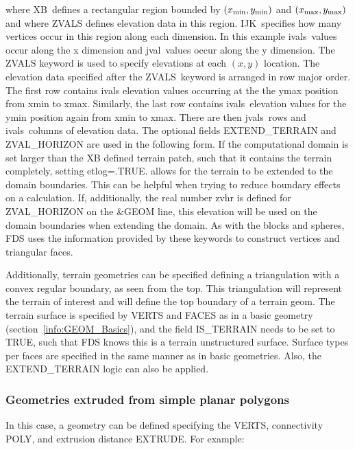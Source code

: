 \documentclass[12pt]{article}
\begin{document}
\noindent where {\ct XB}\ defines a rectangular region bounded by $(x_{\rm min}, y_{\rm min})$  and $(x_{\rm max}, y_{\rm max})$
and where {\ct ZVALS} defines elevation data in this region.
{\ct IJK}\ specifies how many vertices occur in this region along each dimension.
In this example {\ct ivals}\ values occur along the x dimension and {\ct jval}\ values occur along the y dimension.
The {\ct ZVALS} keyword is used to specify elevations at each $(x,y)$ location.
The elevation data specified after the {\ct ZVALS}\ keyword is arranged in row major order.
The first row contains {\ct ivals} elevation values occurring at the the ymax position from xmin to xmax.
Similarly, the last row contains
{\ct ivals}\ elevation values for the ymin position again from xmin to xmax.
There are then {\ct jvals}\ rows and {\ct ivals}\ columns of elevation data.
The optional fields {\ct EXTEND\_TERRAIN} and {\ct ZVAL\_HORIZON} are used in the following form. If the computational domain is set larger than the {\ct XB} defined terrain patch, such that it contains the terrain completely, setting {\ct etlog=.TRUE.} allows for the terrain to be extended to the domain boundaries. This can be helpful when trying to reduce boundary effects on a calculation.
If, additionally, the real number {\ct zvhr} is defined for {\ct ZVAL\_HORIZON} on the {\ct \&GEOM} line, this elevation will be used on the domain boundaries when extending the domain.
As with the blocks and spheres, FDS uses the information provided by these keywords to construct
vertices and triangular faces.

Additionally, terrain geometries can be specified defining a triangulation with a convex regular boundary, as seen from the top. This triangulation will represent the terrain of interest and will define the top boundary of a terrain geom. The terrain surface is specified by {\ct VERTS} and {\ct FACES} as in a basic geometry (section~\ref{info:GEOM_Basics}), and the field {\ct IS\_TERRAIN} needs to be set to {\ct TRUE}, such that FDS knows this is a terrain unstructured surface. Surface types per faces are specified in the same manner as in basic geometries. Also, the {\ct EXTEND\_TERRAIN} logic can also be applied.

\subsubsection{Geometries extruded from simple planar polygons}

In this case, a geometry can be defined specifying the {\ct VERTS}, connectivity {\ct POLY}, and extrusion distance {\ct EXTRUDE}. For example:
\end{document}
